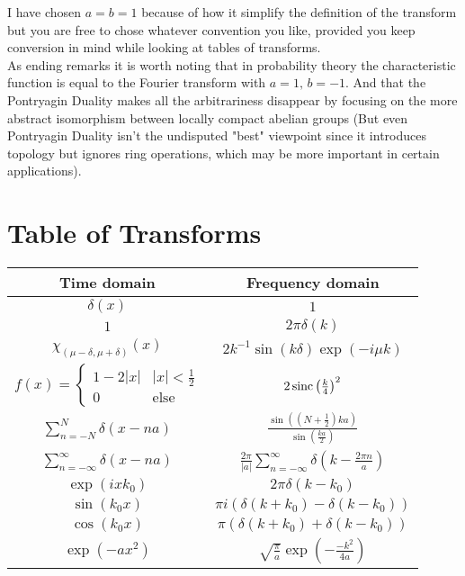 I have chosen $a=b=1$ because of how it simplify the definition of the transform but you are free to chose whatever convention you like, provided you keep conversion in mind while looking at tables of transforms.
\\

As ending remarks it is worth noting that in probability theory the characteristic function is equal to the Fourier transform with $a=1,\,b=-1$. 
And that the Pontryagin Duality makes all the arbitrariness disappear by focusing on the more abstract isomorphism between locally compact abelian groups (But even Pontryagin Duality isn't the undisputed "best" viewpoint since it introduces topology but ignores ring operations, which may be more important in certain applications).

\section{Table of Transforms}

\begin{center}
\begin{tabular}{c|c}
	Time domain & Frequency domain \\ \hline
	$\delta(x)$  & $1$ \\
	$1$ & $2\pi\delta(k)$ \\
	$\chi_{(\mu-\delta,\mu+\delta)}(x)$ & $2k^{-1}\sin\left(k\delta\right)\exp(-i\mu k)$ \\
	$f(x) = \begin{cases} 1-2|x|& |x| <\frac{1}{2}\\ 0& \text{else}\end{cases}$ & $2\operatorname{sinc}\left(\frac{k}{4}\right)^2$ \\
	$\sum_{n=-N}^N\delta(x-na)$ & $\frac{\sin\left(\left(N+\frac{1}{2}\right)ka\right)}{\sin\left(\frac{ka}{2}\right)}$\\
	$\sum_{n=-\infty}^\infty\delta(x-na) $ & $\frac{2\pi}{|a|}\sum_{n=-\infty}^\infty\delta\left(k-\frac{2\pi n}{a}\right)$  \\
	$\exp(ixk_0)$ & $ 2\pi\delta(k-k_0)$ \\
	$\sin(k_0x)$ & $\pi i (\delta(k+k_0)-\delta(k-k_0))$\\
	$\cos(k_0x)$ & $\pi  (\delta(k+k_0)+\delta(k-k_0))$\\
	$\exp(-ax^2)$&$ \sqrt{\frac{\pi}{a}}\exp\left(-\frac{-k^2}{4a}\right)$ \\
\end{tabular}
\end{center}

